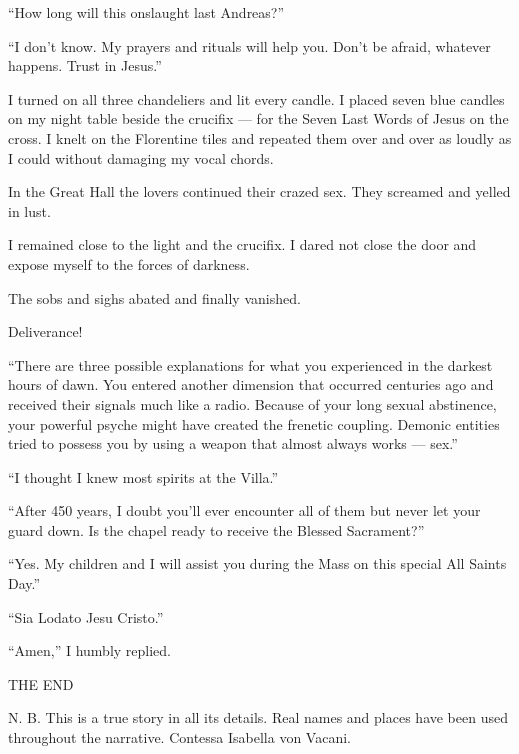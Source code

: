 ``How long will this onslaught last Andreas?''

``I don’t know. My prayers and rituals will help you. Don’t be afraid, whatever happens. Trust in Jesus.''

I turned on all three chandeliers and lit every candle. I placed seven blue candles on my night table beside the crucifix — for the Seven Last Words of Jesus on the cross. I knelt on the Florentine tiles and repeated them over and over as loudly as I could without damaging my vocal chords.

In the Great Hall the lovers continued their crazed sex. They screamed and yelled in lust.

I remained close to the light and the crucifix. I dared not close the door and expose myself to the forces of darkness.

The sobs and sighs abated and finally vanished.

Deliverance!

``There are three possible explanations for what you experienced in the darkest hours of dawn. You entered another dimension that occurred centuries ago and received their signals much like a radio. Because of your long sexual abstinence, your powerful psyche might have created the frenetic coupling. Demonic entities tried to possess you by using a weapon that almost always works — sex.''

``I thought I knew most spirits at the Villa.''

``After 450 years, I doubt you’ll ever encounter all of them but never let your guard down. Is the chapel ready to receive the Blessed Sacrament?''

``Yes. My children and I will assist you during the Mass on this special All Saints Day.''

``Sia Lodato Jesu Cristo.''

``Amen,'' I humbly replied.

THE END

N. B. This is a true story in all its details. Real names and places have been used throughout the narrative. Contessa Isabella von Vacani.